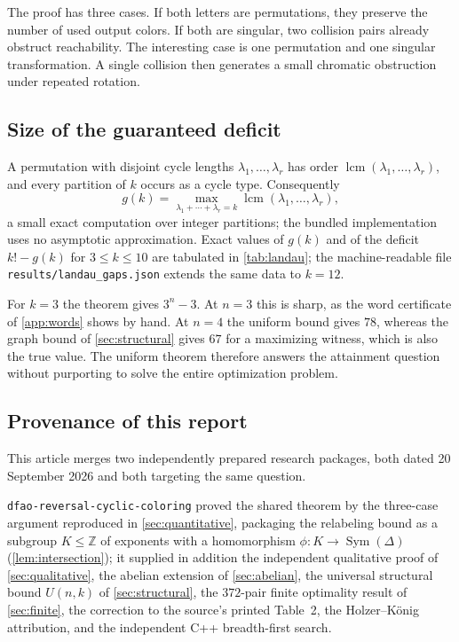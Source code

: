 \documentclass[11pt,a4paper]{article}
\numberwithin{equation}{section}
\theoremstyle{definition}
\theoremstyle{remark}
\newcommand{\Z}{\mathbb Z}
\newcommand{\D}{\Delta}
\newcommand{\Sym}{\operatorname{Sym}}
\newcommand{\lcm}{\operatorname{lcm}}
\begin{document}
The proof has three cases. If both letters are permutations, they preserve
the number of used output colors. If both are singular, two collision pairs
already obstruct reachability. The interesting case is one permutation and
one singular transformation. A single collision then generates a small
chromatic obstruction under repeated rotation.

\subsection{Size of the guaranteed deficit}\label{sec:deficitsize}

A permutation with disjoint cycle lengths $\lambda_1,\ldots,\lambda_r$ has
order $\lcm(\lambda_1,\ldots,\lambda_r)$, and every partition of $k$ occurs
as a cycle type. Consequently
\begin{equation}\label{eq:partitions}
 g(k)=\max_{\lambda_1+\cdots+\lambda_r=k}\lcm(\lambda_1,\ldots,\lambda_r),
\end{equation}
a small exact computation over integer partitions; the bundled
implementation uses no asymptotic approximation. Exact values of $g(k)$ and
of the deficit $k!-g(k)$ for $3\le k\le10$ are tabulated in
\cref{tab:landau}; the machine-readable file
\texttt{results/landau\_gaps.json} extends the same data to $k=12$.

For $k=3$ the theorem gives $3^n-3$. At $n=3$ this is sharp, as the word
certificate of \cref{app:words} shows by hand. At $n=4$ the uniform bound
gives $78$, whereas the graph bound of \cref{sec:structural} gives $67$ for
a maximizing witness, which is also the true value. The uniform theorem
therefore answers the attainment question without purporting to solve the
entire optimization problem.

\subsection{Provenance of this report}\label{sec:provenance}

This article merges two independently prepared research packages, both dated
20 September 2026 and both targeting the same question.

\texttt{dfao-reversal-cyclic-coloring} proved the shared theorem by the
three-case argument reproduced in \cref{sec:quantitative}, packaging the
relabeling bound as a subgroup $K\le\Z$ of exponents with a homomorphism
$\phi:K\to\Sym(\D)$ (\cref{lem:intersection}); it supplied in addition the
independent qualitative proof of \cref{sec:qualitative}, the abelian
extension of \cref{sec:abelian}, the universal structural bound $U(n,k)$ of
\cref{sec:structural}, the $372$-pair finite optimality result of
\cref{sec:finite}, the correction to the source's printed Table~2, the
Holzer--K\"onig attribution, and the independent C++ breadth-first search.
\end{document}
